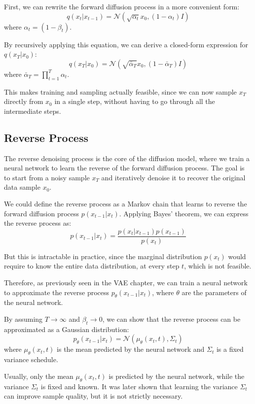 First, we can rewrite the forward diffusion process in a more convenient form:
\[
    q(x_t | x_{t-1}) = \mathcal{N}(\sqrt{\alpha_t} x_0, (1 - \alpha_t) I)
\]
where $\alpha_t = (1 - \beta_t)$.

By recursively applying this equation, we can derive a closed-form expression for $q(x_T | x_0)$:
\[
    q(x_T | x_0) = \mathcal{N}(\sqrt{\bar{\alpha}_T} x_0, (1 - \bar{\alpha}_T) I)
\]
where $\bar{\alpha}_T = \prod_{t=1}^{T} \alpha_t$.

This makes training and sampling actually feasible, since we can now sample $x_T$ directly from $x_0$ in a single step, without having to go through all the intermediate steps.

\subsection{Reverse Process}
The reverse denoising process is the core of the diffusion model, where we train a neural network to learn the reverse of the forward diffusion process. 
The goal is to start from a noisy sample $x_T$ and iteratively denoise it to recover the original data sample $x_0$.

We could define the reverse process as a Markov chain that learns to reverse the forward diffusion process $p(x_{t-1} | x_t)$.
Applying Bayes' theorem, we can express the reverse process as:
\[
    p(x_{t-1} | x_t) = \frac{p(x_t | x_{t-1}) p(x_{t-1})}{p(x_t)}
\]

But this is intractable in practice, since the marginal distribution $p(x_t)$ would require to know the entire data distribution, at every step $t$, which is not feasible.

Therefore, as previously seen in the VAE chapter, we can train a neural network to approximate the reverse process $p_\theta(x_{t-1} | x_t)$, where $\theta$ are the parameters of the neural network.

By assuming $T \rightarrow \infty$ and $\beta_t \rightarrow 0$, we can show that the reverse process can be approximated as a Gaussian distribution:
\[
    p_\theta(x_{t-1} | x_t) = \mathcal{N}(\mu_\theta(x_t, t), \Sigma_t)
\]
where $\mu_\theta(x_t, t)$ is the mean predicted by the neural network and $\Sigma_t$ is a fixed variance schedule.

Usually, only the mean $\mu_\theta(x_t, t)$ is predicted by the neural network, while the variance $\Sigma_t$ is fixed and known. 
It was later shown that learning the variance $\Sigma_t$ can improve sample quality, but it is not strictly necessary.

